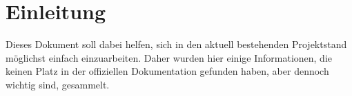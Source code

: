 \section{Einleitung}
Dieses Dokument soll dabei helfen, sich in den aktuell bestehenden Projektstand möglichst einfach einzuarbeiten.
Daher wurden hier einige Informationen, die keinen Platz in der offiziellen Dokumentation gefunden haben, aber dennoch 
wichtig sind, gesammelt. 

